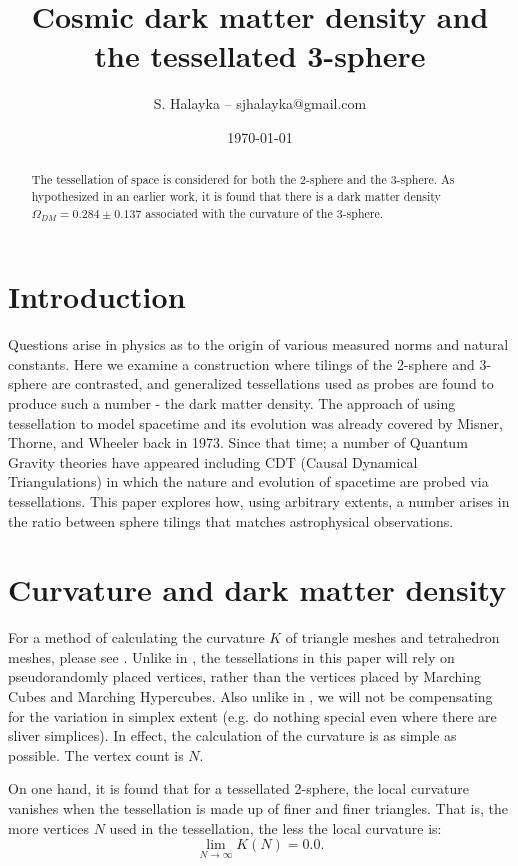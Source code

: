 \documentclass[12pt]{article}
\title{Cosmic dark matter density and the tessellated 3-sphere}
\author{S. Halayka -- sjhalayka@gmail.com}
\date{\today}
\begin{document}
 
\maketitle

\begin{abstract}
The tessellation of space is considered for both the 2-sphere and the 3-sphere.
As hypothesized in an earlier work, it is found that there is a dark matter density $\Omega_{DM} = 0.284 \pm 0.137$ associated with the curvature of the 3-sphere.
\end{abstract}



\section{Introduction}

Questions arise in physics as to the origin of various measured norms and natural constants.  
Here we examine a construction where tilings of the 2-sphere and 3-sphere are contrasted, and generalized tessellations used as probes are found to produce such a number - the dark matter density.
The approach of using tessellation to model spacetime and its evolution was already covered by Misner, Thorne, and Wheeler back in 1973.
Since that time; a number of Quantum Gravity theories have appeared including CDT (Causal Dynamical Triangulations) in which the nature and evolution of spacetime are probed via tessellations.
This paper explores how, using arbitrary extents, a number arises in the ratio between sphere tilings that matches astrophysical observations.



\section{Curvature and dark matter density}

For a method of calculating the curvature $K$ of triangle meshes and tetrahedron meshes, please see \cite{halayka}.
Unlike in \cite{halayka}, the tessellations in this paper will rely on pseudorandomly placed vertices, rather than the vertices placed by Marching Cubes and Marching Hypercubes.
Also unlike in \cite{halayka}, we will not be compensating for the variation in simplex extent (e.g. do nothing special even where there are sliver simplices).
In effect, the calculation of the curvature is as simple as possible.
The vertex count is $N$.

On one hand, it is found that for a tessellated 2-sphere, the local curvature vanishes when the tessellation is made up of finer and finer triangles.
That is, the more vertices $N$ used in the tessellation, the less the local curvature is:
\begin{equation}
\lim_{N \to \infty} K(N) = 0.0.
\end{equation}
\end{document}
